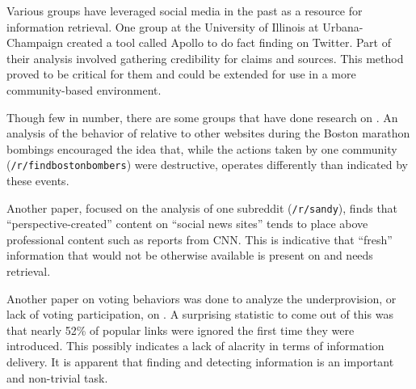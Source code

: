 Various groups have leveraged social media in the past as a resource for
information retrieval. One group at the University of Illinois at
Urbana-Champaign created a tool called Apollo to do fact finding on Twitter.
Part of their analysis involved gathering credibility for claims and
sources.\cite{Le:2011:DDL:2070942.2071018} This method proved to be critical for
them and could be extended for use in a more community-based environment.


Though few in number, there are some groups that have done research on
\reddit{}. An analysis of the behavior of \reddit{} relative to other websites
during the Boston marathon bombings encouraged the idea that, while the actions
taken by one community (\texttt{/r/findbostonbombers}) were destructive,
\reddit{} operates differently than indicated by these events.
\cite{Potts:2013:IRC:2507065.2507079}

Another paper, focused on the analysis of one subreddit (\texttt{/r/sandy}),
finds that ``perspective-created'' content on ``social news sites'' tends to
place above professional content such as reports from CNN.
\cite{Leavitt:2014:UHS:2556288.2557140} This is indicative that ``fresh''
information that would not be otherwise available is present on \reddit{} and
needs retrieval.

Another paper on voting behaviors was done to analyze the underprovision, or
lack of voting participation, on \reddit{}. A surprising statistic to come out
of this was that nearly 52\% of popular links were ignored the first time they
were introduced.\cite{Gilbert:2013:WUR:2441776.2441866} This possibly indicates a
lack of alacrity in terms of information delivery. It is apparent that finding
and detecting information is an important and non-trivial task.

